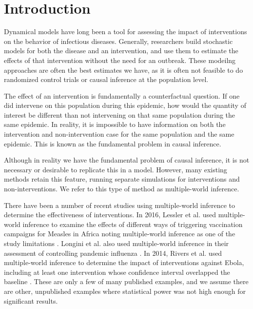 \documentclass[openacc]{rsproca_new}%
\begin{document}

\maketitle


\section{Introduction}

Dynamical models have long been a tool for assessing the impact of interventions on the behavior of infectious diseases.
Generally, researchers build stochastic models for both the disease and an intervention, and use them to estimate the effects of that intervention without the need for an outbreak. \cite{}
These modeilng approaches are often the best estimates we have, as it is often not feasible to do randomized control trials or causal inference at the population level.

The effect of an intervention is fundamentally a counterfactual question.
If one did intervene on this population during this epidemic, how would the quantity of interest be different than not intervening on that same population during the same epidemic.
In reality, it is impossible to have information on both the intervention and non-intervention case for the same population and the same epidemic.
This is known as the fundamental problem in causal inference.\cite{holland:1986}

Although in reality we have the fundamental problem of causal inference, it is not necessary or desirable to replicate this in a model. 
However, many existing methods retain this feature, running separate simulations for interventions and non-interventions.
We refer to this type of method as multiple-world inference.

There have been a number of recent studies using multiple-world inference to determine the effectiveness of interventions.
In 2016, Lessler et al. used multiple-world inference to examine the effects of different ways of triggering vaccination campaigns for Measles in Africa noting multiple-world inference as one of the study limitations \cite{lessler-et-al:2016}.
Longini et al. also used multiple-world inference in their assessment of controlling pandemic influenza \cite{longini-et-al:2005}.
In 2014, Rivers et al. used multiple-world inference to determine the impact of interventions against Ebola, including at least one intervention whose confidence interval overlapped the baseline \cite{rivers-et-al:2014}.
These are only a few of many published examples, and we assume there are other, unpublished examples where statistical power was not high enough for significant results.
\end{document}
